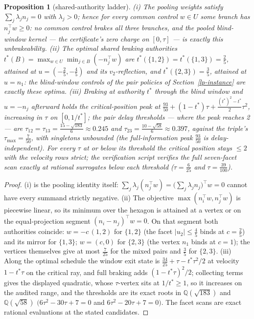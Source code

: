 \documentclass[10pt,twocolumn]{article}
\theoremstyle{plain}
\newtheorem{proposition}[theorem]{Proposition}
\theoremstyle{definition}
\theoremstyle{remark}
\begin{document}
\begin{proposition}[shared-authority ladder]\label{lp-prop:ladder}
\emph{(i)} The pooling weights satisfy \(\sum_j \lambda_j n_j = 0\)
with \(\lambda_j > 0\); hence for every common control \(w \in U\)
some branch has \(n_j^\top w \ge 0\): no common control brakes all
three branches, and the pooled blind-window kernel --- the certificate's
zero charge on \([0, \tau]\) --- is exactly this unbrakeability.
\emph{(ii)} The optimal shared braking authorities
\(t^{*}(B) = \max_{w \in U} \min_{j \in B}(-n_j^\top w)\) are
\(t^{*}(\{1,2\}) = t^{*}(\{1,3\}) = \tfrac25\), attained at
\(u = (-\tfrac25, -\tfrac45)\) and its \(v_2\)-reflection, and
\(t^{*}(\{2,3\}) = \tfrac35\), attained at \(u = n_1\): the
blind-window controls of the pair policies of
Section~\ref{lp-instance} are exactly these optima. \emph{(iii)} Braking at
authority \(t^{*}\) through the blind window and \(u = -n_j\)
afterward holds the critical-position peak at
\(\tfrac{93}{50} + (1 - t^{*})\tau +
\tfrac{(t^{*})^2 - t^{*}}{2}\tau^2\), increasing in \(\tau\) on
\([0, 1/t^{*}]\); the pair delay thresholds --- where the peak reaches
2 --- are \(\tau_{12} = \tau_{13} = \tfrac{15 - \sqrt{183}}{6}
\approx 0.245\) and \(\tau_{23} = \tfrac{10 - \sqrt{58}}{6} \approx
0.397\), against the triple's \(\tau_{\max} = \tfrac7{50}\), with
singletons unbounded (the full-information peak \(\tfrac{93}{50}\) is
delay-independent). For every \(\tau\) at or below its threshold the
critical position stays \(\le 2\) with the velocity rows strict; the verification script verifies the full seven-facet scan exactly at rational
surrogates below each threshold (\(\tau = \tfrac6{25}\) and
\(\tau = \tfrac{39}{100}\)).
\end{proposition}

\begin{proof}
(i) is the pooling identity itself: \(\sum_j \lambda_j
(n_j^\top w) = \bigl(\sum_j \lambda_j n_j\bigr)^\top w = 0\)
cannot have every summand strictly negative. (ii) The objective
\(\max(n_i^\top w, n_j^\top w)\) is piecewise linear, so its
minimum over the hexagon is attained at a vertex or on the
equal-projection segment \((n_i - n_j)^\top w = 0\). On that segment
both authorities coincide: \(w = -c\,(1,2)\) for \(\{1,2\}\) (the
facet \(|u_2| \le \tfrac45\) binds at \(c = \tfrac25\)) and its
mirror for \(\{1,3\}\); \(w = (c, 0)\) for \(\{2,3\}\) (the
vertex \(n_1\) binds at \(c = 1\)); the vertices themselves give at
most \(\tfrac7{25}\) for the mixed pairs and \(\tfrac35\) for
\(\{2,3\}\). (iii) Along the optimal schedule the window exit state is
\(\tfrac{34}{25} + \tau - t^{*}\tau^2/2\) at velocity
\(1 - t^{*}\tau\) on the critical ray, and full braking adds
\((1 - t^{*}\tau)^2/2\); collecting terms gives the displayed
quadratic, whose \(\tau\)-vertex sits at \(1/t^{*} \ge 1\), so it
increases on the audited range, and the thresholds are its exact roots
in \(\mathbb{Q}(\sqrt{183})\) and \(\mathbb{Q}(\sqrt{58})\)
\(\bigl(6\tau^2 - 30\tau + 7 = 0\) and \(6\tau^2 - 20\tau + 7 =
0\bigr)\). The facet scans are exact rational evaluations at the stated
candidates.
\end{proof}
\end{document}
